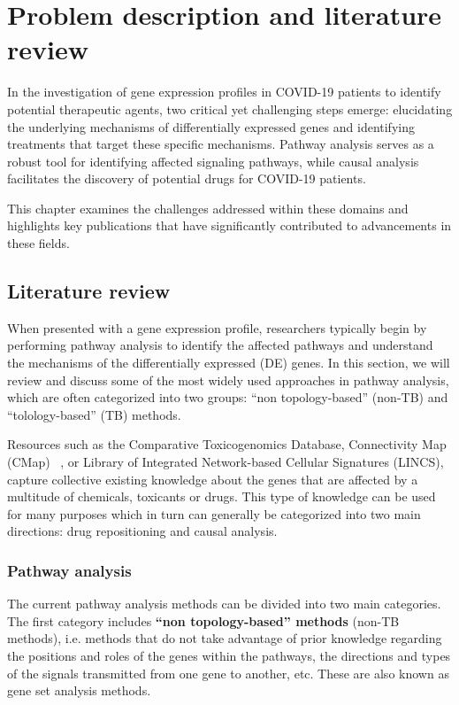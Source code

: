 \documentclass[Minh_PhD_thesis.tex]{subfiles}
\begin{document}
\section{Problem description and literature review}
In the investigation of gene expression profiles in COVID-19 patients to identify potential therapeutic agents, two critical yet challenging steps emerge: elucidating the underlying mechanisms of differentially expressed genes and identifying treatments that target these specific mechanisms. Pathway analysis serves as a robust tool for identifying affected signaling pathways, while causal analysis facilitates the discovery of potential drugs for COVID-19 patients. 

This chapter examines the challenges addressed within these domains and highlights key publications that have significantly contributed to advancements in these fields.



\subsection{Literature review}


When presented with a gene expression profile, researchers typically begin by performing pathway analysis to identify the affected pathways and understand the mechanisms of the differentially expressed (DE) genes. In this section, we will review and discuss some of the most widely used approaches in pathway analysis, which are often categorized into two groups: ``non topology-based''  (non-TB) and ``tolology-based'' (TB) methods.

Resources such as the Comparative Toxicogenomics Database, Connectivity Map (CMap) ~\cite{lamb2007connectivity, lamb2006connectivity}, or Library of Integrated Network-based Cellular Signatures (LINCS), capture collective existing knowledge about the genes that are affected by a multitude of  chemicals, toxicants or drugs. This type of knowledge can be used for many purposes which in turn can generally be categorized into two main directions: drug repositioning and causal analysis.



\subsubsection{Pathway analysis}
The current pathway analysis methods can be divided into two main categories. 
The first category includes \textbf{``non topology-based'' methods} (non-TB methods), i.e. methods  that do not take advantage of prior knowledge regarding the positions and roles of the genes within the pathways, the directions and types of the signals transmitted from one gene to another, etc.  
These are also known as gene set analysis methods. 
\end{document}
